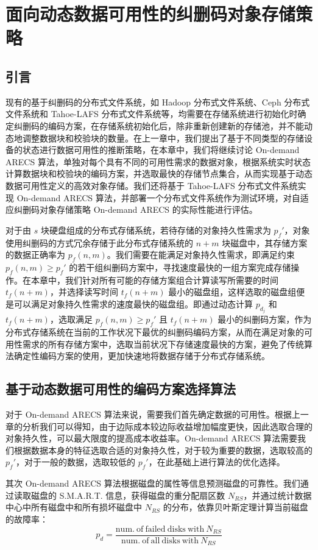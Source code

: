 \chapter{面向动态数据可用性的纠删码对象存储策略}
\section{引言}
现有的基于纠删码的分布式文件系统，如 Hadoop 分布式文件系统、Ceph 分布式文件系统和 Tahoe-LAFS 分布式文件系统等，均需要在存储系统进行初始化时确定纠删码的编码方案，在存储系统初始化后，除非重新创建新的存储池，并不能动态地调整数据块和校验块的数量。在上一章中，我们提出了基于不同类型的存储设备的状态进行数据可用性的推断策略，在本章中，我们将继续讨论 On-demand ARECS 算法，单独对每个具有不同的可用性需求的数据对象，根据系统实时状态计算数据块和校验块的编码方案，并选取最快的存储节点集合，从而实现基于动态数据可用性定义的高效对象存储。我们还将基于 Tahoe-LAFS 分布式文件系统实现 On-demand ARECS 算法，并部署一个分布式文件系统作为测试环境，对自适应纠删码对象存储策略 On-demand ARECS 的实际性能进行评估。

对于由 $s$ 块硬盘组成的分布式存储系统，若待存储的对象持久性需求为 $p_{f}'$，对象使用纠删码的方式冗余存储于此分布式存储系统的 $n+m$ 块磁盘中，其存储方案的数据正确率为 $p_{f}(n,m)$。我们需要在能满足对象持久性需求，即满足约束 $p_{f}(n,m) \geq p_{f}'$ 的若干组纠删码方案中，寻找速度最快的一组方案完成存储操作。在本章中，我们针对所有可能的存储方案组合计算读写所需要的时间 $t_{f}(n+m)$，并选择读写时间 $t_{f}(n+m)$ 最小的磁盘组，这样选取的磁盘组便是可以满足对象持久性需求的速度最快的磁盘组。即通过动态计算 $p_{d_j}$ 和 $t_{f}(n+m)$，选取满足 $p_{f}(n,m) \geq p_{f}'$ 且 $t_{f}(n+m)$ 最小的纠删码方案，作为分布式存储系统在当前的工作状况下最优的纠删码编码方案，从而在满足对象的可用性需求的所有存储方案中，选取当前状况下存储速度最快的方案，避免了传统算法确定性编码方案的使用，更加快速地将数据存储于分布式存储系统。
\section{基于动态数据可用性的编码方案选择算法}
对于 On-demand ARECS 算法来说，需要我们首先确定数据的可用性。根据上一章的分析我们可以得知，由于边际成本较边际收益增加幅度更快，因此选取合理的对象持久性，可以最大限度的提高成本收益率。On-demand ARECS 算法需要我们根据数据本身的特征选取合适的对象持久性，对于较为重要的数据，选取较高的 $p_{f}'$，对于一般的数据，选取较低的 $p_{f}'$，在此基础上进行算法的优化选择。

其次 On-demand ARECS 算法根据磁盘的属性等信息预测磁盘的可靠性。我们通过读取磁盘的 S.M.A.R.T. 信息，获得磁盘的重分配扇区数 $N_{RS}$，并通过统计数据中心中所有磁盘中和所有损坏磁盘中 $N_{RS}$ 的分布，依靠贝叶斯定理计算当前磁盘的故障率：
$$
p_d=\dfrac{\mathrm{num.\ of\ failed\ disks\ with\ }N_{RS}}{\mathrm{num.\ of\ all\ disks\ with\ }N_{RS}}
$$

